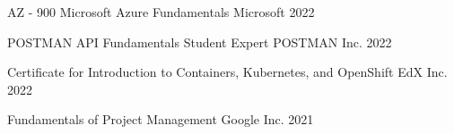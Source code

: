 

\begin{cvhonors}

    \cvhonor
    {AZ - 900 Microsoft Azure Fundamentals} %
    {Microsoft} %
    {} %
    {2022} %

    \cvhonor
    {POSTMAN API Fundamentals Student Expert}
    {POSTMAN Inc.}
    {} %
    {2022} %

    \cvhonor
    {Certificate for Introduction to Containers, Kubernetes, and OpenShift} %
    {EdX Inc.}
    {} %
    {2022} %




    \cvhonor
    {Fundamentals of Project Management} %
    {Google Inc.}
    {} %
    {2021} %

\end{cvhonors}
